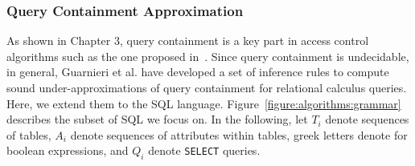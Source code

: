 \subsubsection{Query Containment Approximation}

As shown in Chapter 3, query containment is a key part in access control algorithms such as the one proposed in~\cite{guarnieri2016strong}.
Since query containment is undecidable, in general, Guarnieri et al. have developed a set of inference rules to compute sound under-approximations of query containment for relational calculus queries.
%
Here, we extend them to the SQL language.
%
Figure~\ref{figure:algorithms:grammar} describes the subset of SQL we focus on. 
%
In the following, let $T_i$ denote sequences of tables, $A_i$ denote sequences of attributes within tables, greek letters denote for boolean expressions, and $Q_i$ denote \texttt{SELECT} queries.


